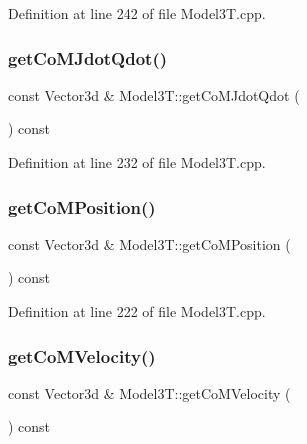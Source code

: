 Definition at line 242 of file Model3\+T.\+cpp.

\hypertarget{classModel3T_a408213f442ab7287c44e86e6d72f825c}{}\label{classModel3T_a408213f442ab7287c44e86e6d72f825c} 
\subsubsection{\texorpdfstring{get\+Co\+M\+Jdot\+Qdot()}{getCoMJdotQdot()}}
{\footnotesize\ttfamily const Vector3d \& Model3\+T\+::get\+Co\+M\+Jdot\+Qdot (\begin{DoxyParamCaption}{ }\end{DoxyParamCaption}) const\hspace{0.3cm}{\ttfamily [virtual]}}



Definition at line 232 of file Model3\+T.\+cpp.

\hypertarget{classModel3T_ad81ca6213b967fb62d8c1682c3389736}{}\label{classModel3T_ad81ca6213b967fb62d8c1682c3389736} 
\subsubsection{\texorpdfstring{get\+Co\+M\+Position()}{getCoMPosition()}}
{\footnotesize\ttfamily const Vector3d \& Model3\+T\+::get\+Co\+M\+Position (\begin{DoxyParamCaption}{ }\end{DoxyParamCaption}) const\hspace{0.3cm}{\ttfamily [virtual]}}



Definition at line 222 of file Model3\+T.\+cpp.

\hypertarget{classModel3T_abe65ef07b4e6c61f6567c1f007631081}{}\label{classModel3T_abe65ef07b4e6c61f6567c1f007631081} 
\subsubsection{\texorpdfstring{get\+Co\+M\+Velocity()}{getCoMVelocity()}}
{\footnotesize\ttfamily const Vector3d \& Model3\+T\+::get\+Co\+M\+Velocity (\begin{DoxyParamCaption}{ }\end{DoxyParamCaption}) const\hspace{0.3cm}{\ttfamily [virtual]}}



